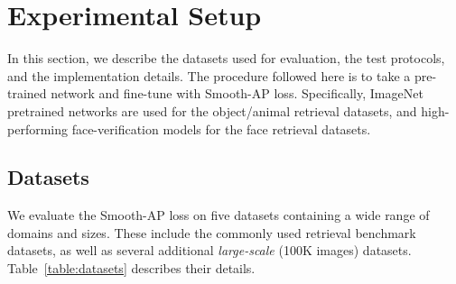 \documentclass[runningheads]{llncs}
\begin{document}
 \label{sec:method}


\section{Experimental Setup}
In this section, 
we describe the datasets used for evaluation, 
the test protocols,  and the implementation details. 
The procedure followed here is to take a pre-trained network and fine-tune with Smooth-AP loss. 
Specifically, 
ImageNet pretrained networks are used for the object/animal retrieval datasets, 
and high-performing face-verification models for the face retrieval datasets.

\subsection{Datasets}
We evaluate the  Smooth-AP loss on five datasets containing a wide range of domains and sizes. 
These include the commonly used retrieval benchmark datasets, as well as several additional
\textit{large-scale} (100K images) datasets.  
Table~\ref{table:datasets} describes their details. \\
\end{document}
